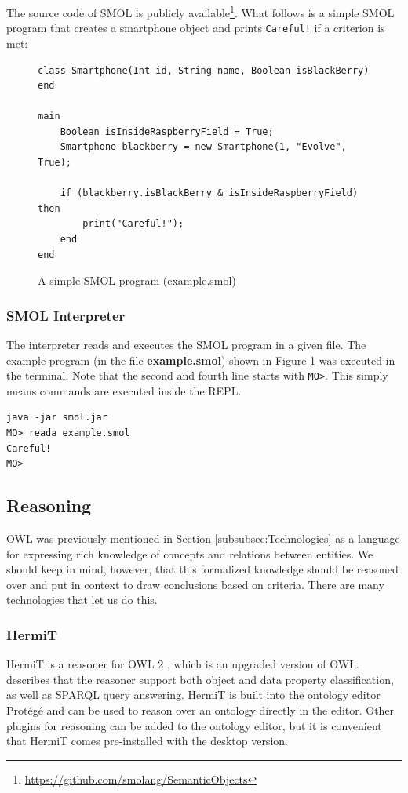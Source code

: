 \documentclass{article}
\begin{document}
The source code of SMOL is publicly available\footnote{\url{https://github.com/smolang/SemanticObjects}}. What follows is a simple SMOL program that creates a smartphone object and prints \verb|Careful!| if a criterion is met:

\begin{figure}[H]
    \centering
    \caption{A simple SMOL program (example.smol)}
    \label{fig:smol_program}
    \begin{Verbatim}[frame=single]
class Smartphone(Int id, String name, Boolean isBlackBerry) end

main
    Boolean isInsideRaspberryField = True;
    Smartphone blackberry = new Smartphone(1, "Evolve", True);

    if (blackberry.isBlackBerry & isInsideRaspberryField) then
        print("Careful!");
    end
end

    \end{Verbatim}
\end{figure}

\subsubsection{SMOL Interpreter}\label{subsubsec:SMOLInterpreter}
The interpreter reads and executes the SMOL program in a given file. The example program (in the file \textbf{example.smol}) shown in Figure \ref{fig:smol_program} was executed in the terminal. Note that the second and fourth line starts with \verb|MO>|. This simply means commands are executed inside the REPL.
\begin{Verbatim}[frame=single]
java -jar smol.jar
MO> reada example.smol
Careful!
MO>
\end{Verbatim}


\subsection{Reasoning}\label{subsec:Reasoning}
OWL was previously mentioned in Section \ref{subsubsec:Technologies} as a language for expressing rich knowledge of concepts and relations between entities. We should keep in mind, however, that this formalized knowledge should be reasoned over and put in context to draw conclusions based on criteria. There are many technologies that let us do this.
\subsubsection{HermiT}
HermiT is a reasoner for OWL 2 \cite{glimm_hermit_2014}, which is an upgraded version of OWL. \citeauthor{glimm_hermit_2014} describes that the reasoner support both object and data property classification, as well as SPARQL query answering. HermiT is built into the ontology editor Protégé and can be used to reason over an ontology directly in the editor. Other plugins for reasoning can be added to the ontology editor, but it is convenient that HermiT comes pre-installed with the desktop version.
\end{document}
